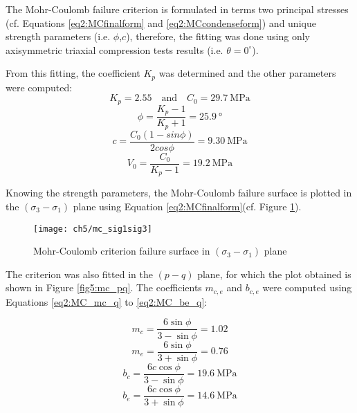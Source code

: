 The Mohr-Coulomb failure criterion is formulated in terms two principal stresses (cf. Equations \ref{eq2:MCfinalform} and \ref{eq2:MCcondenseform}) and unique strength parameters (i.e. $\phi$,$c$), therefore, the fitting was done using only axisymmetric triaxial compression tests results (i.e. $\theta = 0^\circ$). 

From this fitting, the coefficient $K_p$ was determined and the other parameters were computed: 
\begin{equation}
    K_p = 2.55 \quad \textrm{and} \quad C_0 = \SI{29.7}{\mega\pascal}
\end{equation}
\begin{equation}
    \phi = \frac{K_p-1}{K_p+1} = \SI{25.9}{\degree}
\end{equation}
\begin{equation}
    c = \frac{C_0(1-sin\phi)}{2cos\phi} = \SI{9.30}{\mega\pascal}
\end{equation}
\begin{equation}
    V_0 = \frac{C_0}{K_p-1} = \SI{19.2}{\mega\pascal}
\end{equation}

Knowing the strength parameters, the Mohr-Coulomb failure surface is plotted in the $(\sigma_3-\sigma_1)$ plane using Equation \ref{eq2:MCfinalform}(cf. Figure \ref{fig5:mc_sig1sig3}).

\begin{figure}[p]
    \centering
    \texttt{[image: ch5/mc\_sig1sig3]}
    \caption{Mohr-Coulomb criterion failure surface in  $(\sigma_3-\sigma_1)$ plane}
    \label{fig5:mc_sig1sig3}
\end{figure} 

The criterion was also fitted in the $(p-q)$ plane, for which the plot obtained is shown in Figure \ref{fig5:mc_pq}. The coefficients $m_{c,e}$ and $b_{c,e}$ were computed using Equations \ref{eq2:MC_mc_q} to \ref{eq2:MC_be_q}:

\begin{equation}
    m_c = \frac{6 \sin \phi}{3-\sin \phi} = 1.02
\end{equation}
\begin{equation}
    m_e = \frac{6 \sin \phi}{3+\sin \phi} = 0.76
\end{equation}
\begin{equation}
    b_c = \frac{6 c \cos \phi}{3-\sin \phi} = \SI{19.6}{\mega\pascal}
\end{equation}
\begin{equation}
    b_e = \frac{6 c \cos \phi}{3+\sin \phi} = \SI{14.6}{\mega\pascal}
\end{equation}


